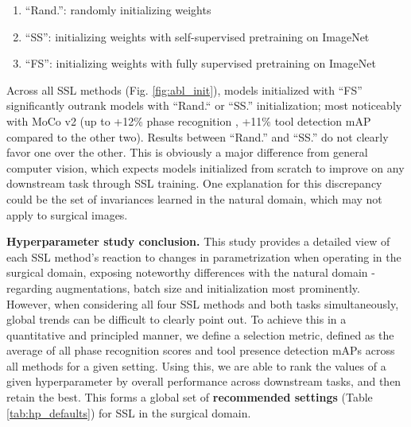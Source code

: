 \documentclass[times,twocolumn,final]{elsarticle}
\begin{document}
\begin{enumerate}
    \item ``Rand.'': randomly initializing weights
    \item ``SS'': initializing weights with self-supervised pretraining on ImageNet
    \item ``FS'': initializing weights with fully supervised pretraining on ImageNet
\end{enumerate}

Across all SSL methods (Fig. \ref{fig:abl_init}), models initialized with ``FS'' significantly outrank models with ``Rand.`` or ``SS.'' initialization; most noticeably with MoCo v2 (up to +12\% phase recognition , +11\% tool detection mAP compared to the other two). Results between ``Rand.'' and ``SS.'' do not clearly favor one over the other. This is obviously a major difference from general computer vision, which expects models initialized from scratch to improve on any downstream task through SSL training. One explanation for this discrepancy could be the set of invariances learned in the natural domain, which may not apply to surgical images.

\noindent\textbf{Hyperparameter study conclusion. }
This study provides a detailed view of each SSL method's reaction to changes in parametrization when operating in the surgical domain, exposing noteworthy differences with the natural domain - regarding augmentations, batch size and initialization most prominently. However, when considering all four SSL methods and both tasks simultaneously, global trends can be difficult to clearly point out. To achieve this in a quantitative and principled manner, we define a selection metric, defined as the average of all phase recognition  scores and tool presence detection mAPs across all methods for a given setting. Using this, we are able to rank the values of a given hyperparameter by overall performance across downstream tasks, and then retain the best. This forms a global set of \textbf{recommended settings} (Table \ref{tab:hp_defaults}) for SSL in the surgical domain.
\end{document}
